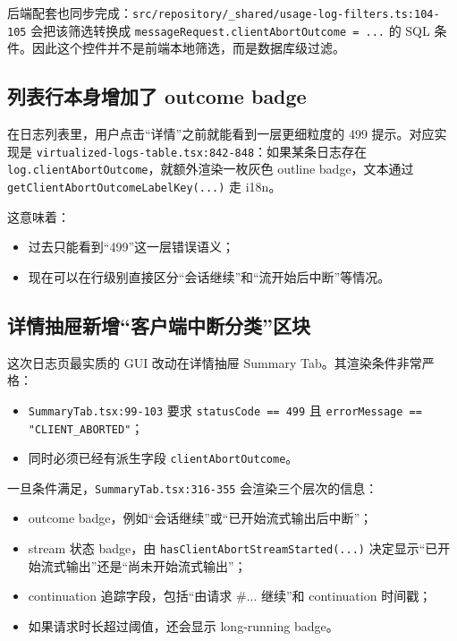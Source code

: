 \documentclass[a4paper]{article}
\newcommand{\filepath}[1]{\nolinkurl{#1}}
\begin{document}
后端配套也同步完成：\filepath{src/repository/_shared/usage-log-filters.ts:104-105} 会把该筛选转换成 \filepath{messageRequest.clientAbortOutcome = ...} 的 SQL 条件。因此这个控件并不是前端本地筛选，而是数据库级过滤。

\subsection{列表行本身增加了 outcome badge}

在日志列表里，用户点击“详情”之前就能看到一层更细粒度的 499 提示。对应实现是 \filepath{virtualized-logs-table.tsx:842-848}：如果某条日志存在 \filepath{log.clientAbortOutcome}，就额外渲染一枚灰色 outline badge，文本通过 \filepath{getClientAbortOutcomeLabelKey(...)} 走 i18n。

这意味着：

\begin{itemize}
\item 过去只能看到“499”这一层错误语义；
\item 现在可以在行级别直接区分“会话继续”和“流开始后中断”等情况。
\end{itemize}

\subsection{详情抽屉新增“客户端中断分类”区块}

这次日志页最实质的 GUI 改动在详情抽屉 Summary Tab。其渲染条件非常严格：

\begin{itemize}
\item \filepath{SummaryTab.tsx:99-103} 要求 \filepath{statusCode == 499} 且 \filepath{errorMessage == "CLIENT_ABORTED"}；
\item 同时必须已经有派生字段 \filepath{clientAbortOutcome}。
\end{itemize}

一旦条件满足，\filepath{SummaryTab.tsx:316-355} 会渲染三个层次的信息：

\begin{itemize}
\item outcome badge，例如“会话继续”或“已开始流式输出后中断”；
\item stream 状态 badge，由 \filepath{hasClientAbortStreamStarted(...)} 决定显示“已开始流式输出”还是“尚未开始流式输出”；
\item continuation 追踪字段，包括“由请求 \#... 继续”和 continuation 时间戳；
\item 如果请求时长超过阈值，还会显示 long-running badge。
\end{itemize}
\end{document}
